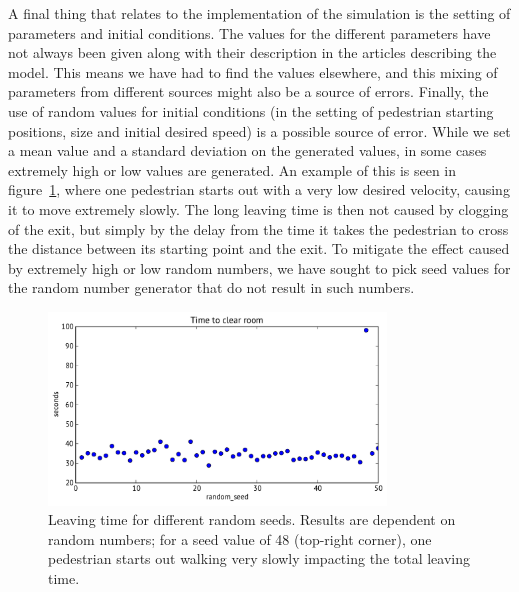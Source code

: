 A final thing that relates to the implementation of the simulation is the 
setting of parameters and initial conditions. The values for the different 
parameters have not always been given along with their description in the 
articles describing the model. This means we have had to find the values 
elsewhere, and this mixing of parameters from different sources might also be 
a source of errors. Finally, the use of random values for initial conditions 
(in the setting of pedestrian starting positions, size and initial desired 
speed) is a possible source of error. While we set a mean value and a standard 
deviation on the generated values, in some cases extremely high or low values 
are generated. An example of this is seen in figure~\ref{fig:random-seed}, 
where one pedestrian starts out with a very low desired velocity, causing it 
to move extremely slowly. The long leaving time is then not caused by clogging 
of the exit, but simply by the delay from the time it takes the pedestrian to 
cross the distance between its starting point and the exit. To mitigate the 
effect caused by extremely high or low random numbers, we have sought to pick 
seed values for the random number generator that do not result in such 
numbers.

\begin{figure}[h]
    \centering
    \includegraphics[width=0.8\textwidth]{Figures/random-seed-variations.pdf}
    \caption[Leaving time for different random seeds]{Leaving time for 
    different random seeds. Results are dependent on random numbers; for a 
    seed value of 48 (top-right corner), one pedestrian starts out walking 
    very slowly impacting the total leaving time.}
    \label{fig:random-seed}
\end{figure}


